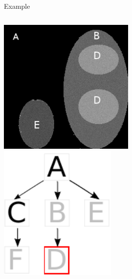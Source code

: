 \begin{frame}
			\begin{exampleblock}{Example}
				\begin{columns}[c]
					\column{5em}
					\includegraphics[trim= -5mm 0mm 0mm 0mm, clip, height=1\textwidth]{image/lobe_img.png}
					\column{5em}
					\includegraphics[trim= -5mm 0mm 0mm 0mm, clip, height=1\textwidth]{image/roi_gt.pdf}
				\end{columns}
			\end{exampleblock}


\end{frame}

